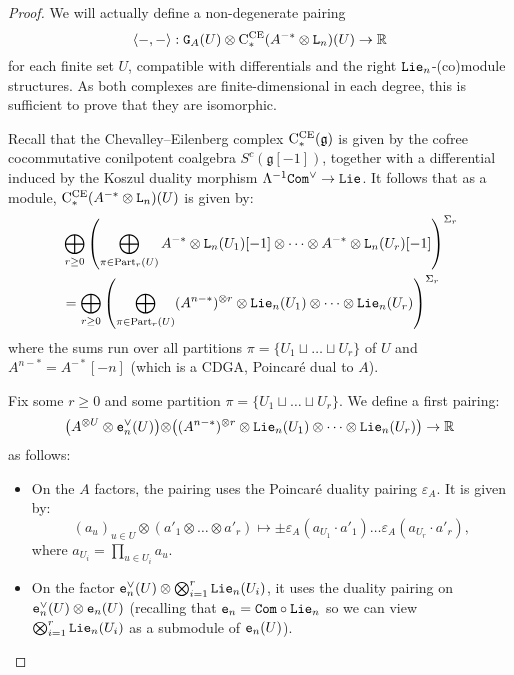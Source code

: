 \begin{proof}
  We will actually define a non-degenerate pairing
  \[ \langle -, - \rangle : \mathtt{G}_{A}(U) \otimes \mathrm{C}_{*}^{\mathrm{CE}}(A^{-*} \otimes \mathtt{L}_{n})(U) \to \mathbb{R} \]
  for each finite set $U$, compatible with differentials and the right $\mathtt{Lie}_{n}$-(co)module structures. As both complexes are finite-dimensional in each degree, this is sufficient to prove that they are isomorphic.

  Recall that the Chevalley--Eilenberg complex $\mathrm{C}_{*}^{\mathrm{CE}}(\mathfrak{g})$ is given by the cofree cocommutative conilpotent coalgebra $S^{c}(\mathfrak{g}[-1])$, together with a differential induced by the Koszul duality morphism $\Lambda^{-1} \mathtt{Com}^{\vee} \to \mathtt{Lie}$.
  It follows that as a module, $\mathrm{C}_{*}^{\mathrm{CE}}(A^{-*} \otimes \mathtt{L}_{n})(U)$ is given by:
  \begin{align}
    & \bigoplus_{r \geq 0} \left( \bigoplus_{\pi \in \operatorname{Part}_{r}(U)} A^{-*} \otimes \mathtt{L}_{n}(U_{1})[-1] \otimes \dots \otimes A^{-*} \otimes \mathtt{L}_{n}(U_{r})[-1] \right)^{\Sigma_{r}}
      \nonumber
    \\
    & = \bigoplus_{r \geq 0} \left( \bigoplus_{\pi \in \operatorname{Part}_{r}(U)} (A^{n-*})^{\otimes r} \otimes \mathtt{Lie}_{n}(U_{1}) \otimes \dots \otimes \mathtt{Lie}_{n}(U_{r}) \right)^{\Sigma_{r}}
      \label{cnf.eq.split-cce}
  \end{align}
  where the sums run over all partitions $\pi = \{ U_{1} \sqcup \dots \sqcup U_{r} \}$ of $U$ and $A^{n-*} = A^{-*}[-n]$ (which is a CDGA, Poincaré dual to $A$).

  Fix some $r \geq 0$ and some partition $\pi = \{ U_{1} \sqcup \dots \sqcup U_{r} \}$.
  We define a first pairing:
  \begin{equation}
    \label{cnf.eq:18}
    \bigr( A^{\otimes U} \otimes \mathtt{e}_{n}^{\vee}(U) \bigl) \otimes \bigl( (A^{n-*})^{\otimes r} \otimes \mathtt{Lie}_{n}(U_{1}) \otimes \dots \otimes \mathtt{Lie}_{n}(U_{r}) \bigr) \to \mathbb{R}
  \end{equation}
  as follows:
  \begin{itemize}
  \item On the $A$ factors, the pairing uses the Poincaré duality pairing $\varepsilon_{A}$.
    It is given by:
    \[ (a_{u})_{u \in U} \otimes (a'_{1} \otimes \dots \otimes a'_{r}) \mapsto \pm \varepsilon_{A} (a_{U_{1}} \cdot a'_{1}) \dots \varepsilon_{A} (a_{U_{r}} \cdot a'_{r}), \]
    where $a_{U_{i}} = \prod_{u \in U_{i}} a_{u}$.
  \item On the factor $\mathtt{e}_{n}^{\vee}(U) \otimes \bigotimes_{i=1}^{r} \mathtt{Lie}_{n}(U_{i})$, it uses the duality pairing on $\mathtt{e}_{n}^{\vee}(U) \otimes \mathtt{e}_{n}(U)$ (recalling that $\mathtt{e}_{n} = \mathtt{Com} \circ \mathtt{Lie}_{n}$ so we can view $\bigotimes_{i=1}^{r} \mathtt{Lie}_{n}(U_{i})$ as a submodule of $\mathtt{e}_{n}(U)$).
  \end{itemize}


\end{proof}
